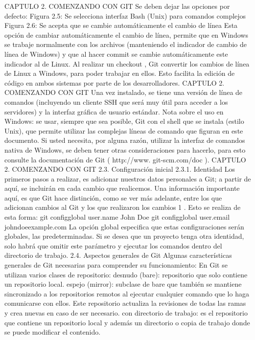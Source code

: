 \documentclass[12pt, spanish, oneside, onecolumn, a4paper]{report}
\begin{document}
 CAPTULO 2. COMENZANDO CON GIT Se deben dejar las opciones por defecto:
Figura 2.5: Se selecciona interfaz Bash (Unix) para comandos complejos
Figura 2.6: Se acepta que se cambie automáticamente el cambio de línea
Esta opción de cambiar automáticamente el cambio de línea, permite que en Windows se trabaje normalmente con los archivos (manteniendo el indicador de cambio de línea de Windows) y que al hacer commit se cambie automáticamente este indicador al de Linux. Al realizar un checkout , Git convertir los cambios de línea de Linux a Windows, para poder trabajar en ellos. Esto facilita la edición de código en ambos sistemas por parte de los desarrolladores.
 CAPTULO 2. COMENZANDO CON GIT Una vez instalado, se tiene una versión de línea de comandos (incluyendo un cliente SSH que será muy útil para acceder a los servidores) y la interfaz gráfica de usuario estándar.
Nota sobre el uso en Windows: se usar, siempre que sea posible, Git con el shell que se instala (estilo Unix), que permite utilizar las complejas líneas de comando que figuran en este documento. Si usted necesita, por alguna razón, utilizar la interfaz de comandos nativa de Windows, se deben tener otras consideraciones para hacerlo, para esto consulte la documentación de Git ( http://www. git-scm.com/doc ).
 CAPTULO 2. COMENZANDO CON GIT 2.3. Configuración inicial
2.3.1. Identidad
Los primeros pasos a realizar, es adicionar nuestros datos personales a Git; a partir de aquí, se incluirán en cada cambio que realicemos. Una información importante aquí, es que Git hace distinción, como se ver más adelante, entre los que adicionan cambios al Git y los que realizaron los cambios 1 .
Esto se realiza de esta forma:
 git configglobal user.name John Doe
 git configglobal user.email johndoeexample.com
La opción  global  especifica que estas configuraciones serán globales, las predeterminadas. Si se desea que un proyecto tenga otra identidad, solo habrá que omitir este parámetro y ejecutar los comandos dentro del directorio de trabajo.
2.4. Aspectos generales de Git
Algunas características generales de Git necesarias para comprender su funcionamiento:
En Git se utilizan varios clases de repositorio:
desnudo (bare): repositorio que solo contiene un repositorio local.
espejo (mirror): subclase de bare que también se mantiene sincronizado a los repositorios remotos al ejecutar cualquier comando que lo haga comunicarse con ellos. Este repositorio actualiza la revisiones de todas las ramas y crea nuevas en caso de ser necesario.
con directorio de trabajo: es el repositorio que contiene un repositorio local y además un directorio o copia de trabajo donde se puede modificar el contenido.
\end{document}
